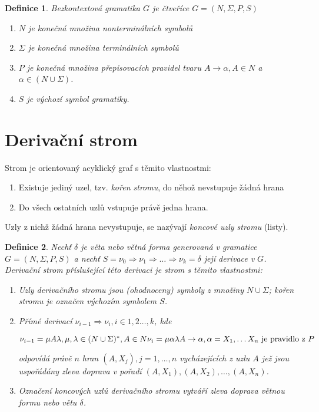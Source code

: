 \documentclass[a4paper, 11pt]{report}
\newtheorem{mydef}{Definice}[chapter]
\begin{document}
\begin{mydef}
Bezkontextová gramatika $G$ je čtveříce $G = (N, \Sigma, P, S)$
\begin{enumerate}
	\item $N$ je konečná množina nonterminálních symbolů
	\item $\Sigma$ je konečná množina terminálních symbolů
	\item $P$ je konečná množina přepisovacích pravidel tvaru $A \to \alpha, A \in N$ a $\alpha \in (N \cup \Sigma)$.
	\item $S$ je výchozí symbol gramatiky.
\end{enumerate}
\end{mydef}

\section{Derivační strom}
Strom je orientovaný acyklický graf s těmito vlastnostmi:
\begin{enumerate}
	\item Existuje jediný uzel, tzv. \emph{kořen stromu}, do něhož nevstupuje žádná hrana
	\item Do všech ostatních uzlů vstupuje právě jedna hrana.
\end{enumerate}
Uzly z nichž žádná hrana nevystupuje, se nazývají \emph{koncové uzly stromu} (listy).

\begin{mydef}
Nechť $\delta$ je věta nebo větná forma generovaná v gramatice $G=(N,\Sigma,P,S)$ a nechť $S=\nu_0 \Rightarrow \nu_1 \Rightarrow \dots \Rightarrow \nu_k = \delta$ její derivace v $G$. Derivační strom příslušející této derivaci je strom s těmito vlastnostmi:
\begin{enumerate}
	\item Uzly derivačního stromu jsou (ohodnoceny) symboly z množiny $N \cup \Sigma$; kořen stromu je označen výchozím symbolem $S$.
	\item Přímé derivací $\nu_{i-1} \Rightarrow \nu_i, i \in 1,2 \dots, k$, kde
	
	$\nu_{i-1} = \mu A \lambda, \mu, \lambda \in (N \cup \Sigma)^*, A \in N\\
	\nu_i = \mu \alpha \lambda \\
	A \to \alpha, \alpha = X_1, \dots X_n \text{ je pravidlo z } P$
	
	odpovídá právě $n$ hran $(A, X_j), j =  1, \dots, n$ vycházejících z uzlu $A$ jež jsou uspořádány zleva doprava v pořadí $(A, X_1), (A, X_2), \dots, (A, X_n)$.
	
	\item Označení koncových uzlů derivačního stromu vytváří zleva doprava větnou formu nebo větu $\delta$.
\end{enumerate}
\end{mydef}
\end{document}

